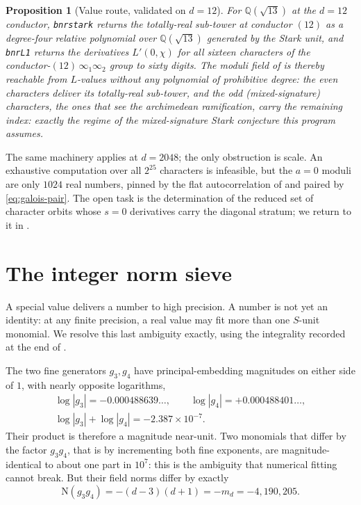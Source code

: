 \documentclass[12pt,a4paper]{article}
\newtheorem{proposition}[theorem]{Proposition}
\newcommand{\md}{m_d}
\newcommand{\Norm}{\mathrm{N}}
\begin{document}
\begin{proposition}[Value route, validated on $d=12$]
\label{prop:portals-d12}
For $\mathbb{Q}(\sqrt{13})$ at the $d=12$ conductor, \texttt{bnrstark} returns
the totally-real sub-tower at conductor $(12)$ as a degree-four relative
polynomial over $\mathbb{Q}(\sqrt{13})$ generated by the Stark unit, and
\texttt{bnrL1} returns the derivatives $L'(0,\chi)$ for all sixteen characters
of the conductor-$(12)\,\infty_1\infty_2$ group to sixty digits. The moduli
field of  is thereby reachable from $L$-values without any
polynomial of prohibitive degree: the even characters deliver its totally-real
sub-tower, and the odd (mixed-signature) characters, the ones that see the
archimedean ramification, carry the remaining index: exactly the regime of the
mixed-signature Stark conjecture this program assumes.
\end{proposition}

The same machinery applies at $d=2048$; the only obstruction is scale. An
exhaustive computation over all $2^{25}$ characters is infeasible, but the $a=0$
moduli are only $1024$ real numbers, pinned by the flat autocorrelation of
 and paired by \eqref{eq:galois-pair}. The open task is the
determination of the reduced set of character orbits whose $s=0$ derivatives
carry the diagonal stratum; we return to it in .

\section{The integer norm sieve}
\label{sec:sieve}

A special value delivers a number to high precision. A number is not yet an
identity: at any finite precision, a real value may fit more than one $S$-unit
monomial. We resolve this last ambiguity exactly, using the integrality
recorded at the end of .

The two fine generators $g_3,g_4$ have principal-embedding magnitudes on either
side of $1$, with nearly opposite logarithms,
\[
\begin{gathered}
\log|g_3| = -0.000488639\ldots,\qquad
\log|g_4| = +0.000488401\ldots,\\
\log|g_3|+\log|g_4| = -2.387\times 10^{-7}.
\end{gathered}
\]
Their product is therefore a magnitude near-unit. Two monomials that differ by
the factor $g_3 g_4$, that is by incrementing both fine exponents, are
magnitude-identical to about one part in $10^{7}$: this is the ambiguity that
numerical fitting cannot break. But their field norms differ by exactly
\[
\Norm(g_3 g_4) = -(d-3)(d+1) = -\md = -4{,}190{,}205 .
\]
\end{document}
